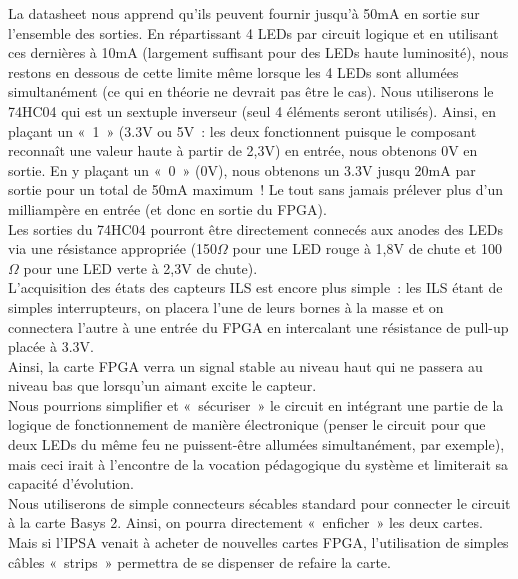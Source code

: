 			La datasheet \cite{bib24} nous apprend qu’ils peuvent fournir jusqu’à 50mA en sortie sur l’ensemble des sorties. En répartissant 4 LEDs par circuit logique et en utilisant ces dernières à 10mA (largement suffisant pour des LEDs  haute luminosité), nous restons en dessous de cette limite même lorsque les 4 LEDs sont allumées simultanément (ce qui en théorie ne devrait pas être le cas).
			Nous utiliserons le 74HC04 qui est un sextuple inverseur (seul 4 éléments seront utilisés). Ainsi, en plaçant un « 1 » (3.3V ou 5V : les deux fonctionnent puisque le composant reconnaît une valeur haute à partir de 2,3V) en entrée, nous obtenons 0V en sortie. En y plaçant un « 0 » (0V), nous obtenons un 3.3V jusqu 20mA par sortie pour un total de 50mA maximum ! Le tout sans jamais prélever plus d’un milliampère en entrée (et donc en sortie du FPGA).\\

			Les sorties du 74HC04 pourront être directement connecés aux anodes des LEDs via une résistance appropriée (150$\Omega$ pour une LED rouge à 1,8V de chute et 100$\Omega$ pour une LED verte à 2,3V de chute).\\


			L’acquisition des états des capteurs ILS est encore plus simple : les ILS étant de simples interrupteurs, on placera l’une de leurs bornes à la masse et on connectera l’autre à une entrée du FPGA en intercalant une résistance de pull-up placée à 3.3V.\\
			Ainsi, la carte FPGA verra un signal stable au niveau haut qui ne passera au niveau bas que lorsqu’un aimant excite le capteur.\\

			Nous pourrions simplifier et « sécuriser » le circuit en intégrant une partie de la logique de fonctionnement de manière électronique (penser le circuit pour que deux LEDs du même feu ne puissent-être allumées simultanément, par exemple), mais ceci irait à l’encontre de la vocation pédagogique du système et limiterait sa capacité d’évolution.\\

			Nous utiliserons de simple connecteurs sécables standard pour connecter le circuit à la carte Basys 2. Ainsi, on pourra directement « enficher » les deux cartes. Mais si l’IPSA venait à acheter de nouvelles cartes FPGA, l’utilisation de simples câbles « strips » permettra de se dispenser de refaire la carte.\\


